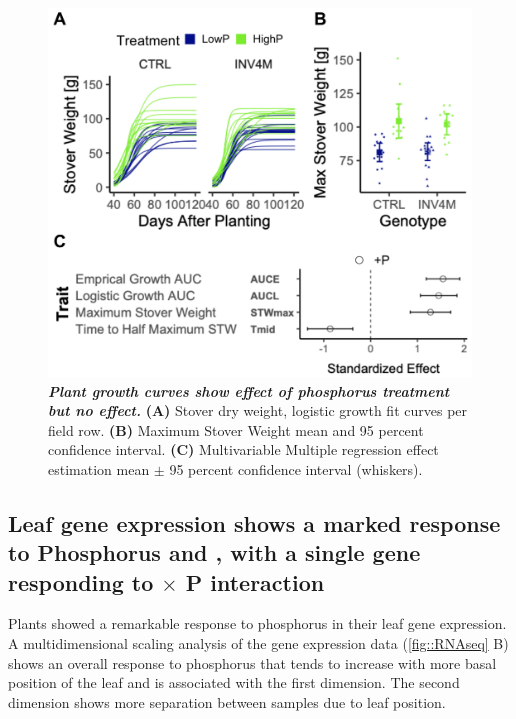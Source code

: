 \begin{figure}[!ht]
\includegraphics[width=\linewidth]{Chapter-3/figs/growth.png}
\caption[Plant growth curves show effect of phosphorus treatment but no \textit{\invfour} effect]{\textbf{\textit{Plant growth curves show effect of phosphorus treatment but no \textit{\invfour} effect.}}
\textbf{(A)} Stover dry weight, logistic growth fit curves per field row.
\textbf{(B)} Maximum Stover Weight mean and 95 percent confidence interval.
\textbf{(C)} Multivariable Multiple regression effect estimation mean $\pm$ 95 percent confidence interval (whiskers).
}
\label{fig::growth}
\end{figure}


\subsection{Leaf gene expression shows a marked response to Phosphorus and \invfour, with a single gene responding to \invfour $\times$ P interaction}

Plants showed a remarkable response to phosphorus in their leaf gene expression.
A multidimensional scaling analysis of the gene expression data (\autoref{fig::RNAseq} B) shows an overall response to phosphorus that tends to increase with more basal position of the leaf and is associated with the first dimension. 
The second dimension shows more separation between samples due to leaf position.

